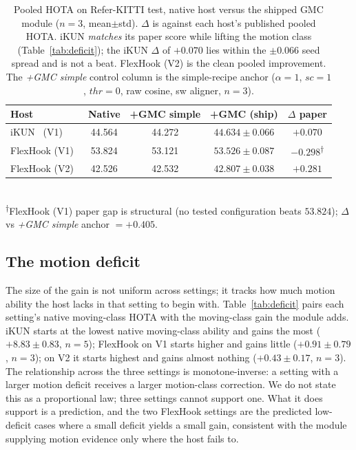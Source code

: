 \documentclass[sigconf,review,anonymous]{acmart}
\begin{document}
\begin{table}[t]
\centering
\caption{Pooled HOTA on Refer-KITTI test, native host versus the shipped GMC module ($n{=}3$, mean$\pm$std). $\Delta$ is against each host's published pooled HOTA. iKUN \emph{matches} its paper score while lifting the motion class (Table~\ref{tab:deficit}); the iKUN $\Delta$ of $+0.070$ lies within the $\pm0.066$ seed spread and is not a beat. FlexHook (V2) is the clean pooled improvement. The \emph{+GMC simple} control column is the simple-recipe anchor ($\alpha{=}1$, $sc{=}1$, $thr{=}0$, raw cosine, sw aligner, $n{=}3$).}
\label{tab:main}
\small
\setlength{\tabcolsep}{4pt}
\begin{tabular}{lcccc}
\toprule
Host & Native & +GMC simple & +GMC (ship) & $\Delta$ paper \\
\midrule
iKUN~\cite{ikun} (V1)        & 44.564 & 44.272 & $44.634 \pm 0.066$ & $+0.070$ \\
FlexHook (V1)~\cite{flexhook}  & 53.824 & 53.121 & $53.526 \pm 0.087$ & $-0.298$\textsuperscript{$\dagger$} \\
FlexHook (V2)~\cite{flexhook}  & 42.526 & 42.532 & $42.807 \pm 0.038$ & $+0.281$ \\
\bottomrule
\end{tabular}
\\[2pt]
{\footnotesize \textsuperscript{$\dagger$}FlexHook (V1) paper gap is structural (no tested configuration beats $53.824$); $\Delta$ vs \emph{+GMC simple} anchor $= +0.405$.}
\end{table}

\subsection{The motion deficit}
\label{sec:deficit}

The size of the gain is not uniform across settings; it tracks how much motion ability the host lacks in that setting to begin with. Table~\ref{tab:deficit} pairs each setting's native moving-class HOTA with the moving-class gain the module adds. iKUN starts at the lowest native moving-class ability and gains the most ($+8.83 \pm 0.83$, $n{=}5$); FlexHook on V1 starts higher and gains little ($+0.91 \pm 0.79$, $n{=}3$); on V2 it starts highest and gains almost nothing ($+0.43 \pm 0.17$, $n{=}3$). The relationship across the three settings is monotone-inverse: a setting with a larger motion deficit receives a larger motion-class correction. We do not state this as a proportional law; three settings cannot support one. What it does support is a prediction, and the two FlexHook settings are the predicted low-deficit cases where a small deficit yields a small gain, consistent with the module supplying motion evidence only where the host fails to.
\end{document}
